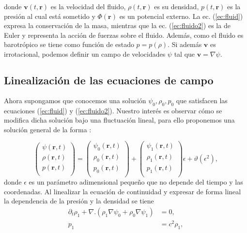 donde $\textbf{v}(t,\textbf{r})$ es la velocidad del fluido, $\rho(t,\textbf{r})$ es su densidad, $p(t,\textbf{r})$ es la presi\'{o}n al cual est\'{a} sometido y $\Phi(\textbf{r})$ es un potencial externo. La ec. (\ref{ec:fluid}) expresa la conservaci\'{o}n de la masa, mientras que la ec. (\ref{ec:fluido2}) es la de Euler y representa la acci\'{o}n de fuerzas sobre el fluido. Adem\'{a}s, como el fluido es barotr\'{o}pico se tiene como funci\'{o}n de estado $p=p(\rho)$. Si adem\'{a}s $\textbf{v}$ es irrotacional, podemos definir un campo de velocidades $\psi$ tal que $\textbf{v}=\nabla \psi$.

\subsection{Linealizaci\'{o}n de las ecuaciones de campo}

Ahora supongamos que conocemos una solución $\psi_0,\rho_0, p_0$ que satisfacen las ecuaciones (\ref{ec:fluid}) y (\ref{ec:fluido2}). Nuestro inter\'{e}s es observar c\'{o}mo se modifica dicha soluci\'{o}n bajo una fluctuaci\'{o}n lineal, para ello proponemos una soluci\'{o}n general de la forma \citep{bookLandau}:

\begin{equation}
\begin{pmatrix}
\psi(\textbf{r},t)\\ 
\rho(\textbf{r},t)\\ 
p(\textbf{r},t)\\ 

\end{pmatrix}=\begin{pmatrix}
\psi_0(\textbf{r},t)\\ 
\rho_0(\textbf{r},t)\\ 
p_0(\textbf{r},t)\\ 

\end{pmatrix}+\begin{pmatrix}
\psi_1(\textbf{r},t)\\ 
\rho_1(\textbf{r},t)\\ 
p_1(\textbf{r},t)\\ 

\end{pmatrix}\epsilon+\vartheta(\epsilon^2),
\end{equation}
donde $\epsilon$ es un parámetro adimensional pequeño que no depende del tiempo y las coordenadas. Al linealizar la ecuaci\'{o}n de continuidad y expresar de forma lineal la dependencia de la presi\'{o}n y la densidad se tiene
\begin{align}
\nonumber  \partial_t \rho_1 +\nabla .(\rho_1 \nabla \psi_0+\rho_0\nabla \psi_1)&=0,\\
      p_1&=c^2\rho_1,
\end{align}\label{ec:fluidolin1}

